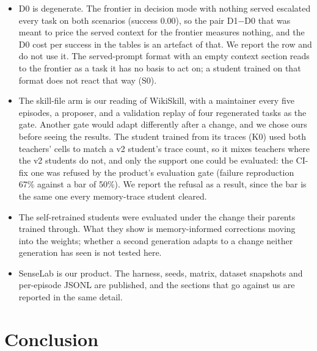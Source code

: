 \documentclass[11pt]{article}
\newcommand{\cond}[1]{\textsf{#1}}
\begin{document}
\begin{itemize}[leftmargin=1.4em, itemsep=2pt]
on every trace.
\item \cond{D0} is degenerate. The frontier in decision mode with nothing served escalated
every task on both scenarios (success 0.00), so the pair \cond{D1}$-$\cond{D0} that was meant
to price the served context for the frontier measures nothing, and the \cond{D0} cost per
success in the tables is an artefact of that. We report the row and do not use it. The
served-prompt format with an empty context section reads to the frontier as a task it has no
basis to act on; a student trained on that format does not react that way (\cond{S0}).
\item The skill-file arm is our reading of WikiSkill, with a maintainer every five episodes,
a proposer, and a validation replay of four regenerated tasks as the gate. Another gate would
adapt differently after a change, and we chose ours before seeing the results. The student
trained from its traces (\cond{K0}) used both teachers' cells to match a v2 student's trace
count, so it mixes teachers where the v2 students do not, and only the support one could be
evaluated: the CI-fix one was refused by the product's evaluation gate (failure reproduction
67\% against a bar of 50\%). We report the refusal as a result, since the bar is the same one
every memory-trace student cleared.
\item The self-retrained students were evaluated under the change their parents trained
through. What they show is memory-informed corrections moving into the weights; whether a
second generation adapts to a change neither generation has seen is not tested here.
\item SenseLab is our product. The harness, seeds, matrix, dataset snapshots and per-episode
JSONL are published, and the sections that go against us are reported in the same detail.
\end{itemize}

\section{Conclusion}
\end{document}
